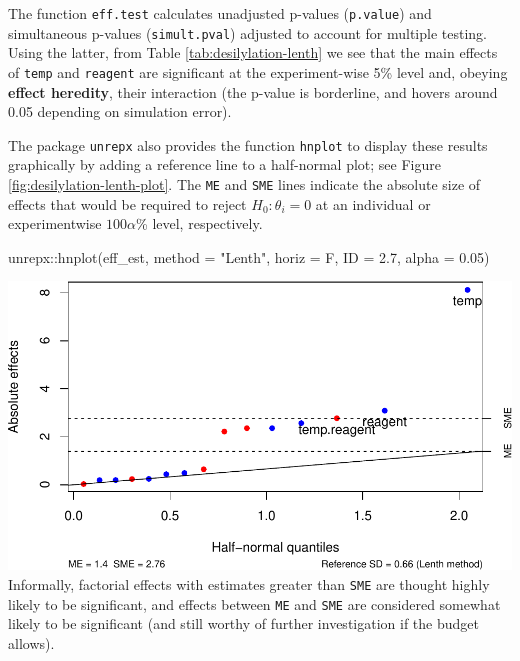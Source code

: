 \documentclass[
]{book}
\newenvironment{Shaded}{\begin{snugshade}}{\end{snugshade}}
\newcommand{\AttributeTok}[1]{\textcolor[rgb]{0.77,0.63,0.00}{#1}}
\newcommand{\FloatTok}[1]{\textcolor[rgb]{0.00,0.00,0.81}{#1}}
\newcommand{\FunctionTok}[1]{\textcolor[rgb]{0.00,0.00,0.00}{#1}}
\newcommand{\NormalTok}[1]{#1}
\newcommand{\SpecialCharTok}[1]{\textcolor[rgb]{0.00,0.00,0.00}{#1}}
\newcommand{\StringTok}[1]{\textcolor[rgb]{0.31,0.60,0.02}{#1}}
\theoremstyle{definition}
\theoremstyle{definition}
\theoremstyle{definition}
\theoremstyle{definition}
\theoremstyle{remark}
\begin{document}
The function \texttt{eff.test} calculates unadjusted p-values (\texttt{p.value}) and simultaneous p-values (\texttt{simult.pval}) adjusted to account for multiple testing. Using the latter, from Table \ref{tab:desilylation-lenth} we see that the main effects of \texttt{temp} and \texttt{reagent} are significant at the experiment-wise 5\% level and, obeying \textbf{effect heredity}, their interaction (the p-value is borderline, and hovers around 0.05 depending on simulation error).

The package \texttt{unrepx} also provides the function \texttt{hnplot} to display these results graphically by adding a reference line to a half-normal plot; see Figure \ref{fig:desilylation-lenth-plot}. The \texttt{ME} and \texttt{SME} lines indicate the absolute size of effects that would be required to reject \(H_0: \theta_i = 0\) at an individual or experimentwise \(100\alpha\)\% level, respectively.

\begin{Shaded}
\begin{Highlighting}[]
\NormalTok{unrepx}\SpecialCharTok{::}\FunctionTok{hnplot}\NormalTok{(eff\_est, }\AttributeTok{method =} \StringTok{"Lenth"}\NormalTok{, }\AttributeTok{horiz =}\NormalTok{ F, }\AttributeTok{ID =} \FloatTok{2.7}\NormalTok{, }\AttributeTok{alpha =} \FloatTok{0.05}\NormalTok{)}
\end{Highlighting}
\end{Shaded}

\includegraphics{bookdown_math3014-6027_files/figure-latex/desilylation-lenth-plot-1.pdf}
Informally, factorial effects with estimates greater than \texttt{SME} are thought highly likely to be significant, and effects between \texttt{ME} and \texttt{SME} are considered somewhat likely to be significant (and still worthy of further investigation if the budget allows).
\end{document}
